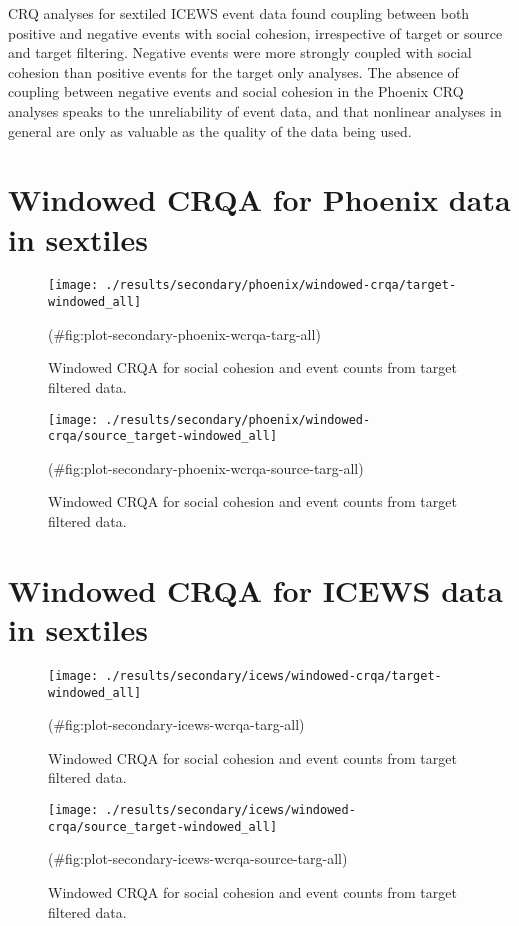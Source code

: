 \begin{appendix}
CRQ analyses for sextiled ICEWS event data found coupling between both
positive and negative events with social cohesion, irrespective of
target or source and target filtering. Negative events were more
strongly coupled with social cohesion than positive events for the
target only analyses. The absence of coupling between negative events
and social cohesion in the Phoenix CRQ analyses speaks to the
unreliability of event data, and that nonlinear analyses in general are
only as valuable as the quality of the data being used.

\hypertarget{windowed-crqa-for-phoenix-data-in-sextiles}{%
\section{Windowed CRQA for Phoenix data in
sextiles}\label{windowed-crqa-for-phoenix-data-in-sextiles}}

\begin{figure}
\texttt{[image: ./results/secondary/phoenix/windowed-crqa/target-windowed\_all]} \caption{Windowed CRQA for social cohesion and event counts from target filtered data.}(\#fig:plot-secondary-phoenix-wcrqa-targ-all)
\end{figure}

\begin{figure}
\texttt{[image: ./results/secondary/phoenix/windowed-crqa/source\_target-windowed\_all]} \caption{Windowed CRQA for social cohesion and event counts from target filtered data.}(\#fig:plot-secondary-phoenix-wcrqa-source-targ-all)
\end{figure}

\hypertarget{windowed-crqa-for-icews-data-in-sextiles}{%
\section{Windowed CRQA for ICEWS data in
sextiles}\label{windowed-crqa-for-icews-data-in-sextiles}}

\begin{figure}
\texttt{[image: ./results/secondary/icews/windowed-crqa/target-windowed\_all]} \caption{Windowed CRQA for social cohesion and event counts from target filtered data.}(\#fig:plot-secondary-icews-wcrqa-targ-all)
\end{figure}

\begin{figure}
\texttt{[image: ./results/secondary/icews/windowed-crqa/source\_target-windowed\_all]} \caption{Windowed CRQA for social cohesion and event counts from target filtered data.}(\#fig:plot-secondary-icews-wcrqa-source-targ-all)
\end{figure}
\end{appendix}
